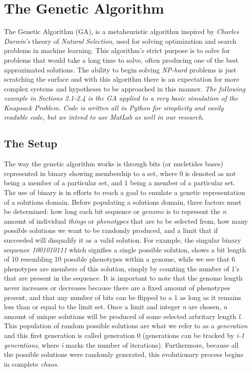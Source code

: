 \section{The Genetic Algorithm}
\label{sec: the genetic algorithm}

The Genetic Algorithm (GA), is a metaheuristic algorithm inspired by \emph{Charles Darwin's} theory of \emph{Natural Selection}, used for solving optimization and search problems in machine learning. This algorithm's strict purpose is to solve for problems that would take a long time to solve, often producing one of the best approximated solutions. The ability to begin solving \emph{NP-hard} problems is just scratching the surface and with this algorithm there is an expectation for more complex systems and hypotheses to be approached in this manner. \emph{The following example in Sections 2.1-2.4 is the GA applied to a very basic simulation of the Knapsack Problem. Code is written all in Python for simplicity and easily readable code, but we intend to use MatLab as well in our research}.

\subsection{The Setup}
\label{setup} 

The way the genetic algorithm works is through bits (or nucletides bases) represented in binary showing membership to a set, where 0 is denoted as not being a member of a particular set, and 1 being a member of a particular set. The use of binary is in efforts to reach a goal to emulate a genetic representation of a solutions domain. 
Before populating a solutions domain, three factors must be determined: how long each bit sequence or \emph{genome} is to represent the \emph{n}  amount of individual \emph{things} or \emph{phenotypes} that are to be selected from, how many possible solutions we want to be randomly produced, and a limit that if succeeded will disqualify it as a valid solution. For example, the singular binary sequence \emph{1001010111} which signifies a single possible solution, shows a bit length of 10 resembling 10 possible phenotypes within a genome, while we see that 6 phenotypes are members of this solution, simply by counting the number of 1's that are present in the sequence. It is important to note that the genome length never increases or decreases because there are a fixed amount of phenotypes present, and that any number of bits can be flipped to a 1 as long as it remains less than or equal to the limit set. Once a limit and integer \emph{n} are chosen, \emph{n} amount of unique solutions will be produced of some selected arbritary length \emph{l}. This population of random possible solutions are what we refer to as a \emph{generation} and this first generation is called generation 0 (generations can be tracked by \emph{i-1 generations}, where \emph{i} marks the number of iterations). Furthermore, because all the possible solutions were randomly generated, this evolutionary process begins in complete \emph{chaos}.

